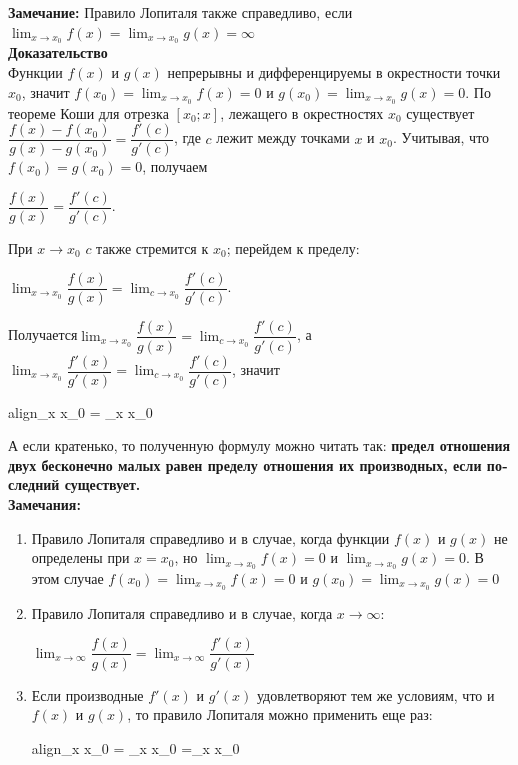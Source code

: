\documentclass[oneside]{book}
\newcommand{\boxedeq}[2]{\begin{empheq}[box={\fboxsep=6pt\fbox}]{align}\label{#1}#2\end{empheq}}
\begin{document}
\begin{itemize}
\textbf{Замечание:}
Правило Лопиталя также справедливо, если  $\lim_{x \to x_{0}} f(x) =\lim_{x \to x_{0}} g(x) = \infty$\\

\textbf{Доказательство}\\
Функции $f(x)$ и $g(x)$ непрерывны и дифференцируемы в окрестности точки $x_{0}$, значит
$f(x_{0})=\lim_{x \to x_{0}} f(x) = 0$ и $g(x_{0})=\lim_{x \to x_{0}} g(x) = 0$. По теореме Коши для отрезка $[x_{0};x]$, лежащего в окрестностях $x_{0}$ существует $\dfrac{f(x)-f(x_{0})}{g(x)-g(x_{0})}=\dfrac{f'(c)}{g'(c)}$, где $c$ лежит между точками $x$ и $x_{0}$. Учитывая, что  $f(x_{0})=g(x_{0})=0$, получаем \begin{center}
	$\dfrac{f(x)}{g(x)}=\dfrac{f'(c)}{g'(c)}$.
\end{center} При $x\to x_{0}$ $c$ также стремится к $x_{0}$; перейдем к пределу: \begin{center}
	$\lim_{x \to x_{0}} \dfrac{f(x)}{g(x)} = \lim_{c \to x_{0}} \dfrac{f'(c)}{g'(c)}$.

\end{center}
Получается$\lim_{x \to x_{0}} \dfrac{f(x)}{g(x)} = \lim_{c \to x_{0}} \dfrac{f'(c)}{g'(c)}$, а $\lim_{x \to x_{0}} \dfrac{f'(x)}{g'(x)} = \lim_{c \to x_{0}} \dfrac{f'(c)}{g'(c)}$, значит \begin{center}
	\boxedeq{eq:*}{\lim_{x{\large } \to x_{0}}  = \lim_{x \to x_{0}} \dfrac{f'(x)}{g'(x)}}
\end{center}
А если кратенько, то полученную формулу можно читать так: \textbf{предел отношения двух
	бесконечно малых равен пределу отношения их производных, если по­
	следний существует.}\\

\textbf{Замечания:}
\begin{enumerate}

	\item Правило Лопиталя справедливо и в случае, когда функции $f(x)$ и $g(x)$ не определены при  $x=x_{0}$, но $\lim_{x \to x_{0}} f(x) = 0$ и $\lim_{x \to x_{0}} g(x) = 0$. В этом случае $f(x_{0})=\lim_{x \to x_{0}} f(x) = 0$ и $g(x_{0})=\lim_{x \to x_{0}} g(x) = 0$
	\item Правило Лопиталя справедливо и в случае, когда ${x \to \infty}$: \begin{center}
		$\lim_{x \to \infty} \dfrac{f(x)}{g(x)} = \lim_{x \to \infty} \dfrac{f'(x)}{g'(x)}$
	\end{center}
	\item Если производные $f'(x)$ и $g'(x)$ удовлетворяют тем же условиям, что и $f(x)$ и $g(x)$, то правило Лопиталя можно применить еще раз:\boxedeq{eq:*}{\lim_{x{\large } \to x_{0}}  = \lim_{x \to x_{0}} \dfrac{f'(x)}{g'(x)}=\lim_{x \to x_{0}} \dfrac{f''(x)}{g''(x)}}


\end{enumerate}
\end{itemize}
\end{document}
